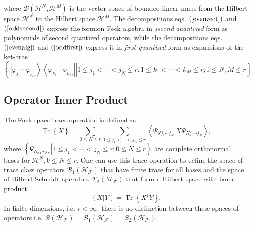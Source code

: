 \documentclass[aps,preprint,amsfonts,amssymb,showpacs,showkeys]{revtex4}%
\begin{document}
where $\mathcal{B}\left(  \mathcal{H}^{N},\mathcal{H}^{M}\right)  $ is the
vector space of bounded linear maps from the Hilbert space $\mathcal{H}^{N}$
to the Hilbert space $\mathcal{H}^{M}.$ The decompositions eqs. $\left(
\ref{evenvect}\right)  $ and $\left(  \ref{oddsecond}\right)  $ express the
fermion Fock algebra in \emph{second quantized} form as polynomials of second
quantized operators, while the decompositions eqs. $\left(  \ref{evenalg}%
\right)  $ and $\left(  \ref{oddfirst}\right)  $ express it in \emph{first
quantized} form as expansions of the ket-bras
\begin{equation}
\left\{  \left.  \left\vert \varphi_{j_{1}}\cdots\varphi_{j_{N}}\right\rangle
\left\langle \varphi_{k_{1}}\cdots\varphi_{k_{M}}\right\vert \right\vert 1\leq
j_{1}<\cdots<j_{N}\leq r,1\leq k_{1}<\cdots<k_{M}\leq r;0\leq N,M\leq
r\right\}
\end{equation}


\subsection{Operator Inner Product \label{Inner prod}}

The Fock space trace operation is defined as
\begin{equation}
\operatorname*{Tr}\left\{  X\right\}  =\sum_{0\leq N\leq r}\sum_{1\leq
j_{1}<\cdots<j_{N}\leq r}\left\langle \Psi_{Nj_{1}\cdots j_{N}}\left\vert
X\Psi_{Nj_{1}\cdots j_{N}}\right.  \right\rangle ,
\end{equation}
where $\left\{  \left.  \Psi_{Nj_{1}\cdots j_{N}}\right\vert 1\leq
j_{1}<\cdots<j_{N}\leq r;0\leq N\leq r\right\}  $ are complete orthonormal
bases for $\mathcal{H}^{N},0\leq N\leq r.$ One can use this trace operation to
define the space of trace class operators $\mathcal{B}_{1}\left(
\mathcal{H}_{\mathcal{F}}\right)  $ that have finite trace for all bases and
the space of Hilbert Schmidt operators $\mathcal{B}_{2}\left(  \mathcal{H}%
_{\mathcal{F}}\right)  $ that form a Hilbert space with inner product
\begin{equation}
\left(  X\left\vert Y\right.  \right)  =\operatorname*{Tr}\left\{  X^{\dagger
}Y\right\}  .
\end{equation}
In finite dimensions, i.e. $r<\infty,$ there is no distinction between these
spaces of operators i.e. $\mathcal{B}\left(  \mathcal{H}_{\mathcal{F}}\right)
=\mathcal{B}_{1}\left(  \mathcal{H}_{\mathcal{F}}\right)  =\mathcal{B}%
_{2}\left(  \mathcal{H}_{\mathcal{F}}\right)  .$
\end{document}

